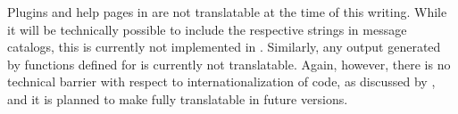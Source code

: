 \documentclass[article,shortnames]{jss}
\begin{document}
Plugins and help pages in  are not translatable at the time of this
writing. While it will be technically possible to include the respective strings in
message catalogs, this is currently not implemented in . Similarly, any
output generated by  functions defined for  is currently not
translatable. Again, however, there is no technical barrier with respect to
internationalization of  code, as discussed by \cite{Ripley2005a},
and it is planned to make  fully translatable in future versions.


\end{document}
